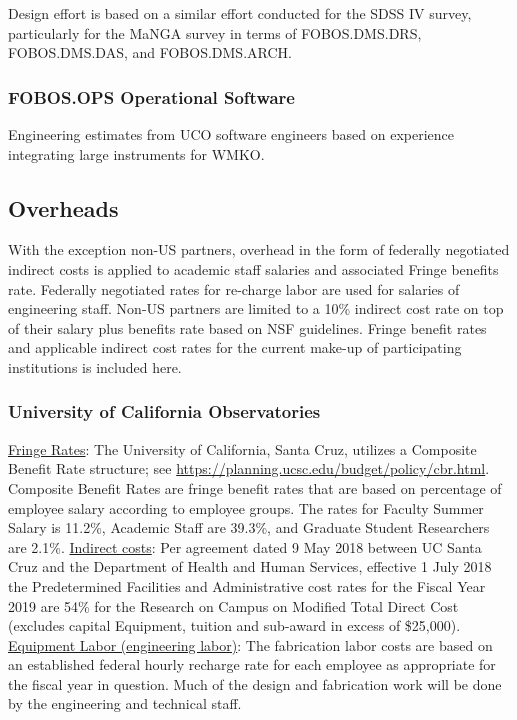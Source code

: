 \documentclass[oneside,11pt]{amsart}
\begin{document}
Design effort is based on a similar effort conducted for the SDSS IV
survey, particularly for the MaNGA survey in terms of FOBOS.DMS.DRS,
FOBOS.DMS.DAS, and FOBOS.DMS.ARCH.

\subsubsection{FOBOS.OPS Operational Software}

Engineering estimates from UCO software engineers based on experience
integrating large instruments for WMKO.

\subsection{Overheads}

With the exception non-US partners, overhead in the form of federally
negotiated indirect costs is applied to academic staff salaries and
associated Fringe benefits rate. Federally negotiated rates for
re-charge labor are used for salaries of engineering staff. Non-US
partners are limited to a 10\% indirect cost rate on top of their
salary plus benefits rate based on NSF guidelines. Fringe benefit
rates and applicable indirect cost rates for the current make-up of
participating institutions is included here.

\subsubsection{University of California Observatories}

\underline{Fringe Rates}: The University of California, Santa Cruz,
utilizes a Composite Benefit Rate
structure; see \url{https://planning.ucsc.edu/budget/policy/cbr.html}.
Composite Benefit Rates are fringe benefit rates that are based on
percentage of employee salary according to employee groups. The rates
for Faculty Summer Salary is 11.2\%, Academic Staff are 39.3\%, and
Graduate Student Researchers are 2.1\%. \underline{Indirect costs}:
Per agreement dated 9 May 2018 between UC Santa Cruz and the
Department of Health and Human Services, effective 1 July 2018 the
Predetermined Facilities and Administrative cost rates for the Fiscal
Year 2019 are 54\% for the Research on Campus on Modified Total
Direct Cost (excludes capital Equipment, tuition and sub-award in
excess of \$25,000). \underline{Equipment Labor (engineering labor)}:
The fabrication labor costs are based on an established federal
hourly recharge rate for each employee as appropriate for the fiscal
year in question. Much of the design and fabrication work will be
done by the engineering and technical staff.
\end{document}
